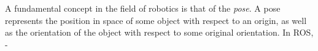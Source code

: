 A fundamental concept in the field of robotics is that of the \textit{pose}. A pose represents the position in space of some object with respect to an origin, as well as the orientation of the object with respect to some original orientation. In \gls{ROS}, -